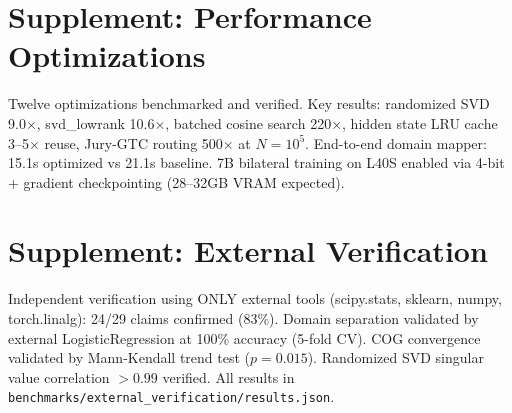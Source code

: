 \documentclass[11pt]{article}
\begin{document}
\newpage

















\section*{Supplement: Performance Optimizations}

Twelve optimizations benchmarked and verified. Key results: randomized SVD 9.0$\times$, svd\_lowrank 10.6$\times$, batched cosine search 220$\times$, hidden state LRU cache 3--5$\times$ reuse, Jury-GTC routing 500$\times$ at $N=10^5$. End-to-end domain mapper: 15.1s optimized vs 21.1s baseline. 7B bilateral training on L40S enabled via 4-bit + gradient checkpointing (28--32GB VRAM expected).

\section*{Supplement: External Verification}

Independent verification using ONLY external tools (scipy.stats, sklearn, numpy, torch.linalg): 24/29 claims confirmed (83\%). Domain separation validated by external LogisticRegression at 100\% accuracy (5-fold CV). COG convergence validated by Mann-Kendall trend test ($p=0.015$). Randomized SVD singular value correlation $>0.99$ verified. All results in \texttt{benchmarks/external\_verification/results.json}.
\end{document}
